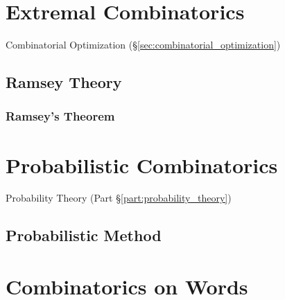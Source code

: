 \section{Extremal Combinatorics}\label{sec:extremal_combinatorics}

Combinatorial Optimization (\S\ref{sec:combinatorial_optimization})



\subsection{Ramsey Theory}\label{sec:ramsey_theory}

\subsubsection{Ramsey's Theorem}\label{sec:ramseys_theorem}



\section{Probabilistic Combinatorics}\label{sec:probabilistic_combinatorics}

Probability Theory (Part \S\ref{part:probability_theory})



\subsection{Probabilistic Method}\label{sec:probabilistic_method}



\section{Combinatorics on Words}\label{sec:combinatorics_on_words}

